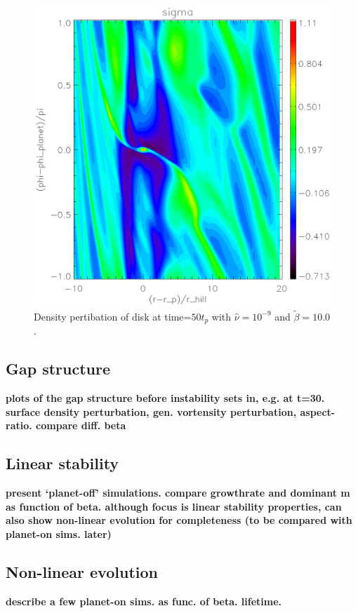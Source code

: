 \begin{figure}
   \includegraphics[scale=.60]{figures/analysis_sigma50highb.ps}
   \caption{Density pertibation of disk at time=$50t_p$ with $\hat{\nu}=10^{-9}$ and $\tilde{\beta}=10.0$. }
 \label{shortterm_highb)}
 \end{figure}


\subsection{Gap structure}
{\bf plots of the gap structure before instability sets in, e.g. at
  t=30. surface density perturbation, gen. vortensity perturbation,
  aspect-ratio. compare diff. beta
}


\subsection{Linear stability}
{\bf present `planet-off' simulations. compare growthrate and dominant
  m as function of beta. although focus is linear stability
  properties, can also show non-linear evolution for completeness (to
  be compared with planet-on sims. later)
}

\subsection{Non-linear evolution}
           {\bf describe a few planet-on sims. as func. of beta. lifetime. 
           }

